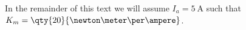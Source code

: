  In the remainder of this text we will assume $I_a = \qty {5}{\ampere }$ such that $K_m = \qty {20}{{\newton \meter} \per \ampere }$. 

